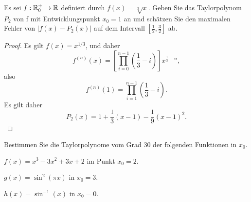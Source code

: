 \begin{Problem}
	Es sei $f : \mathbb{R}_0^+ \to \mathbb{R}$ definiert durch $f (x) = \sqrt[3]{x}$. Geben Sie das Taylorpolynom $P_2$ von f mit Entwicklungspunkt $x_0 = 1$ an und schätzen Sie den maximalen Fehler von $|f(x) - P_2(x)|$ auf dem Intervall $\left[ \frac{1}{2},\frac{3}{2} \right] $ ab.
\end{Problem}
\begin{proof}
	Es gilt $f(x)=x^{1 / 3}$, und daher
	\[
		f^{(n)}(x)=\left[\prod_{i=0}^{n-1} \left( \frac{1}{3}-i \right) \right]x^{\frac{1}{3}-n} 
	,\] 
	also
	\[
		f^{(n)}(1)=\prod_{i=1}^{n-1} \left( \frac{1}{3}-i \right)  
	.\] 
	Es gilt daher
	\[
	P_2(x)=1+\frac{1}{3}(x-1)-\frac{1}{9}(x-1)^2
	.\] 
\end{proof}
\begin{Problem}
	Bestimmen Sie die Taylorpolynome vom Grad 30 der folgenden Funktionen in $x_0$.
	\begin{parts}
	\item $f(x)=x^3-3x^2+3x+2$ im Punkt $x_0=2$.
	\item $g(x)=\sin^2\left( \pi x \right) $ in $x_0=3$.
	\item $h(x)=\sin^{-1}(x)$ in $x_0=0$.
	\end{parts}
\end{Problem}
